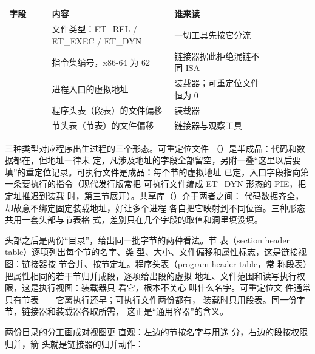 \begin{longtable}{L{0.14\linewidth}L{0.4\linewidth}L{0.32\linewidth}}
\toprule
字段 & 内容 & 谁来读 \\
\midrule
{} & 文件类型：ET\_REL / ET\_EXEC / ET\_DYN & 一切工具先按它分流 \\\tablerowrule
{} & 指令集编号，x86-64 为 62 & 链接器据此拒绝混链不同 ISA \\\tablerowrule
{} & 进程入口的虚拟地址 & 装载器；可重定位文件恒为 0 \\\tablerowrule
{} & 程序头表（段表）的文件偏移 & 装载器 \\\tablerowrule
{} & 节头表（节表）的文件偏移 & 链接器与观察工具 \\
\bottomrule
\end{longtable}

三种类型对应程序出生过程的三个形态。可重定位文件
（）是半成品：代码和数据都在，但地址一律未
定，凡涉及地址的字段全部留空，另附一叠“这里以后要
填”的重定位记录。可执行文件是成品：每个节的虚拟地址
已定，入口字段指向第一条要执行的指令（现代发行版常把
可执行文件编成 ET\_DYN 形态的 PIE，把定址推迟到装载
时，第三节展开）。共享库（）介于两者之间：
代码数据齐全，却故意不绑定固定装载地址，好让多个进程
各自把它映射到不同位置。三种形态共用一套头部与节表格
式，差别只在几个字段的取值和洞里填没填。

头部之后是两份“目录”，给出同一批字节的两种看法。节
表（section header table）逐项列出每个节的名字、类
型、大小、文件偏移和属性标志，这是链接视图：链接器按
节合并、按节定址。程序头表（program header table，常
称段表）把属性相同的若干节归并成段，逐项给出段的虚拟
地址、文件范围和读写执行权限，这是执行视图：装载器只
看它，根本不关心  叫什么名字。可重定位文
件通常只有节表——它离执行还早；可执行文件两份都有，
装载时只用段表。同一份字节，链接器和装载器各取所需，
这正是“通用容器”的含义。

两份目录的分工画成对视图更
直观：左边的节按名字与用途
分，右边的段按权限归并，箭
头就是链接器的归并动作：

